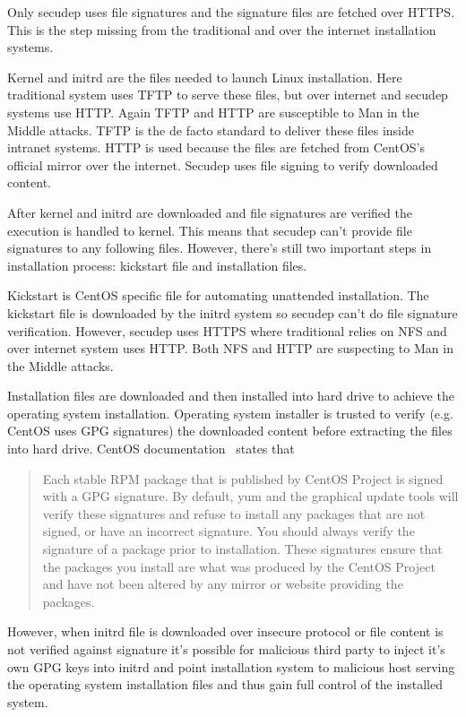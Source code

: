 Only secudep uses file signatures and the signature files are fetched
over HTTPS. This is the step missing from the traditional and over the
internet installation systems.

Kernel and initrd are the files needed to launch Linux
installation. Here traditional system uses TFTP to serve these files,
but over internet and secudep systems use HTTP. Again TFTP and HTTP
are susceptible to Man in the Middle attacks. TFTP is the de facto
standard to deliver these files inside intranet systems. HTTP is used
because the files are fetched from CentOS's official mirror over the
internet. Secudep uses file signing to verify downloaded content.

After kernel and initrd are downloaded and file signatures are
verified the execution is handled to kernel. This means that secudep
can't provide file signatures to any following files. However, there's
still two important steps in installation process: kickstart file and
installation files.

Kickstart is CentOS specific file for automating unattended
installation. The kickstart file is downloaded by the initrd system so
secudep can't do file signature verification. However, secudep uses
HTTPS where traditional relies on NFS and over internet system uses
HTTP. Both NFS and HTTP are suspecting to Man in the Middle attacks.

Installation files are downloaded and then installed into hard drive
to achieve the operating system installation. Operating system
installer is trusted to verify (e.g. CentOS uses GPG signatures) the
downloaded content before extracting the files into hard drive. CentOS
documentation~\cite{centos-gpg} states that

\begin{quote}
Each stable RPM package that is published by CentOS Project is signed
with a GPG signature. By default, yum and the graphical update tools
will verify these signatures and refuse to install any packages that
are not signed, or have an incorrect signature. You should always
verify the signature of a package prior to installation. These
signatures ensure that the packages you install are what was produced
by the CentOS Project and have not been altered by any mirror or
website providing the packages.
\end{quote}

However, when initrd file is downloaded over insecure protocol or file
content is not verified against signature it's possible for malicious
third party to inject it's own GPG keys into initrd and point
installation system to malicious host serving the operating system
installation files and thus gain full control of the installed system.
